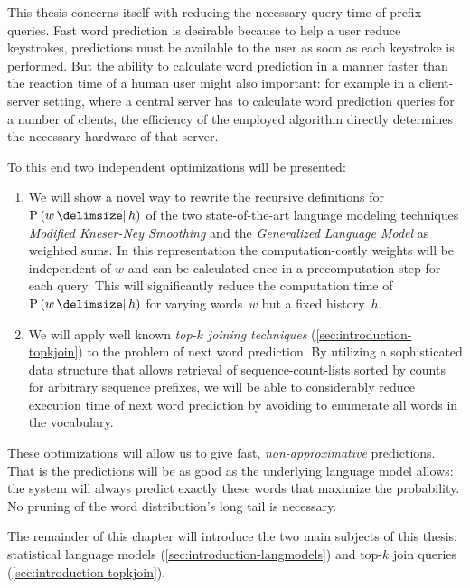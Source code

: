 This thesis concerns itself with reducing the necessary query time of prefix
queries.
Fast word prediction is desirable because to help a user reduce keystrokes,
predictions must be available to the user as soon as each keystroke is
performed.
But the ability to calculate word prediction in a manner faster than the reaction
time of a human user might also important:
for example in a client-server setting, where a central server has to calculate
word prediction queries for a number of clients, the efficiency of the employed
algorithm directly determines the necessary hardware of that server.

To this end two independent optimizations will be presented:
\begin{enumerate}
  \item We will show a novel way to rewrite the recursive definitions for
    $\Prob{w}{h}$ of the two state-of-the-art language modeling techniques
    \emph{Modified Kneser-Ney Smoothing} and the \emph{Generalized Language
    Model} as weighted sums.
    In this representation the com\-pu\-ta\-tion-costly weights will be
    independent of $w$ and can be calculated once in a precomputation step for
    each query.
    This will significantly reduce the computation time of $\Prob{w}{h}$ for
    varying words~$w$ but a fixed history~$h$.
  \item We will apply well known \emph{top-$k$ joining techniques}
    (\cref{sec:introduction-topkjoin}) to the problem of next word prediction.
    By utilizing a sophisticated data structure that allows retrieval of
    sequence-count-lists sorted by counts for arbitrary sequence prefixes,
    we will be able to considerably reduce execution time of next word
    prediction by avoiding to enumerate all words in the vocabulary.
\end{enumerate}

These optimizations will allow us to give fast, \emph{non-approximative}
predictions.
That is the predictions will be as good as the underlying language model allows:
the system will always predict exactly these words that maximize the
probability.
No pruning of the word distribution's long tail is necessary.

The remainder of this chapter will introduce the two main subjects of this
thesis: statistical language models (\cref{sec:introduction-langmodels}) and
top-$k$ join queries (\cref{sec:introduction-topkjoin}).



